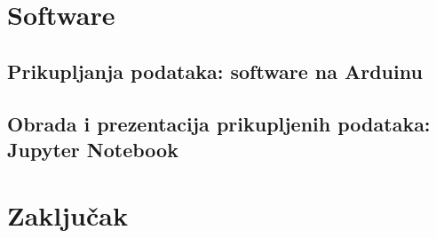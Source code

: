 \documentclass[11pt,a4paper,twoside,openright]{report}
\begin{document}
\chapter{Software}
\section{Prikupljanja podataka: software na Arduinu}
\section{Obrada i prezentacija prikupljenih podataka: Jupyter Notebook}

\chapter{Zaključak}

\newpage
\nocite{*}


\newpage
\appendix
\end{document}
